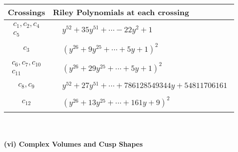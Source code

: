 \documentclass[1p]{elsarticle_modified}
\theoremstyle{definition}
\begin{document}
\begin{tabular}{m{50pt}|m{274pt}}
Crossings & \hspace{64pt}Riley Polynomials at each crossing \\
\hline $$\begin{aligned}c_{1},c_{2},c_{4}\\c_{5}\end{aligned}$$&$\begin{aligned}
&y^{52}+35 y^{51}+\cdots-22 y^2+1
\end{aligned}$\\
\hline $$\begin{aligned}c_{3}\end{aligned}$$&$\begin{aligned}
&(y^{26}+9 y^{25}+\cdots+5 y+1)^{2}
\end{aligned}$\\
\hline $$\begin{aligned}c_{6},c_{7},c_{10}\\c_{11}\end{aligned}$$&$\begin{aligned}
&(y^{26}+29 y^{25}+\cdots+5 y+1)^{2}
\end{aligned}$\\
\hline $$\begin{aligned}c_{8},c_{9}\end{aligned}$$&$\begin{aligned}
&y^{52}+27 y^{51}+\cdots+786128549344 y+54811706161
\end{aligned}$\\
\hline $$\begin{aligned}c_{12}\end{aligned}$$&$\begin{aligned}
&(y^{26}+13 y^{25}+\cdots+161 y+9)^{2}
\end{aligned}$\\
\hline
\end{tabular}\\~\\
\newpage\flushleft \textbf{(vi) Complex Volumes and Cusp Shapes}
\end{document}
